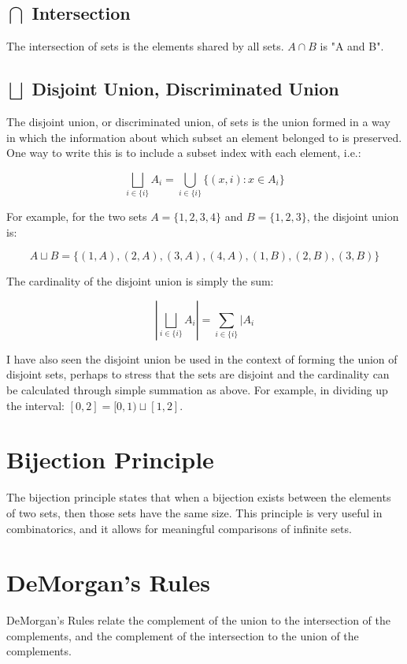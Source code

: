 \subsection{$\bigcap$ Intersection}
The intersection of sets is the elements shared by all sets. $A\cap B$ is "A and B".

\subsection{$\bigsqcup$ Disjoint Union, Discriminated Union}
The disjoint union, or discriminated union, of sets is the union formed in a way in which the information about which subset an element belonged to is preserved. One way to write this is to include a subset index with each element, i.e.:

\begin{equation}
\bigsqcup_{i\in\{i\}}A_i = \bigcup_{i\in\{i\}} \{(x,i): x\in A_i\}
\end{equation}

For example, for the two sets $A=\{1,2,3,4\}$ and $B=\{1,2,3\}$, the disjoint union is:

\begin{equation}
A\sqcup B = \{(1,A),(2,A),(3,A),(4,A),(1,B),(2,B),(3,B)\}
\end{equation}

The cardinality of the disjoint union is simply the sum:

\begin{equation}
\left|\bigsqcup_{i\in\{i\}}A_i\right| = \sum_{i\in\{i\}}|A_i
\end{equation}

I have also seen the disjoint union be used in the context of forming the union of disjoint sets, perhaps to stress that the sets are disjoint and the cardinality can be calculated through simple summation as above. For example, in dividing up the interval: $[0,2]=[0,1)\sqcup[1,2]$.


\section{Bijection Principle}
The bijection principle states that when a bijection exists between the elements of two sets, then those sets have the same size. This principle is very useful in combinatorics, and it allows for meaningful comparisons of infinite sets.


\section{DeMorgan's Rules}
\label{sec:demorgan}
DeMorgan's Rules relate the complement of the union to the intersection of the complements, and the complement of the intersection to the union of the complements.

